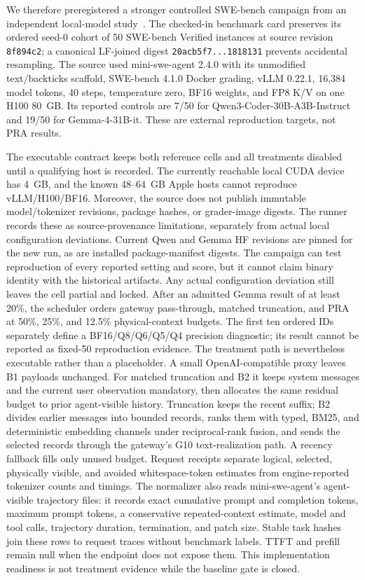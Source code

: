 \documentclass[11pt]{article}
\begin{document}
We therefore preregistered a stronger controlled SWE-bench campaign from an
independent local-model study~\cite{av2026localcoding}. The checked-in benchmark
card preserves its ordered seed-0 cohort of 50 SWE-bench Verified instances at
source revision \texttt{8f894c2}; a canonical LF-joined digest
\texttt{20acb5f7...1818131} prevents accidental resampling. The source used
mini-swe-agent 2.4.0 with its unmodified text/backticks scaffold, SWE-bench
4.1.0 Docker grading, vLLM 0.22.1, 16,384 model tokens, 40 steps, temperature
zero, BF16 weights, and FP8 K/V on one H100 80~GB. Its reported controls are
7/50 for Qwen3-Coder-30B-A3B-Instruct and 19/50 for Gemma-4-31B-it. These are
external reproduction targets, not PRA results.

The executable contract keeps both reference cells and all treatments disabled
until a qualifying host is recorded. The currently reachable local CUDA device
has 4~GB, and the known 48--64~GB Apple hosts cannot reproduce
vLLM/H100/BF16. Moreover, the source does not publish immutable
model/tokenizer revisions, package hashes, or grader-image digests. The runner
records these as source-provenance limitations, separately from actual local
configuration deviations. Current Qwen and Gemma HF revisions are pinned for
the new run, as are installed package-manifest digests. The campaign can test
reproduction of every reported setting and score, but it cannot claim binary
identity with the historical artifacts. Any actual configuration deviation
still leaves the cell partial and locked. After an admitted Gemma result of at
least 20\%, the scheduler orders gateway pass-through, matched
truncation, and PRA at 50\%, 25\%, and 12.5\% physical-context budgets. The
first ten ordered IDs separately define a BF16/Q8/Q6/Q5/Q4 precision
diagnostic; its result cannot be reported as fixed-50 reproduction evidence.
The treatment path is nevertheless executable rather than a placeholder. A
small OpenAI-compatible proxy leaves B1 payloads unchanged. For matched
truncation and B2 it keeps system messages and the current user observation
mandatory, then allocates the same residual budget to prior agent-visible
history. Truncation keeps the recent suffix; B2 divides earlier messages into
bounded records, ranks them with typed, BM25, and deterministic embedding
channels under reciprocal-rank fusion, and sends the selected records through
the gateway's G10 text-realization path. A recency fallback fills only unused
budget. Request receipts separate logical, selected, physically visible, and
avoided whitespace-token estimates from engine-reported tokenizer counts and
timings. The normalizer also reads mini-swe-agent's agent-visible trajectory
files: it records exact cumulative prompt and completion tokens, maximum prompt
tokens, a conservative repeated-context estimate, model and tool calls,
trajectory duration, termination, and patch size. Stable task hashes join these
rows to request traces without benchmark labels. TTFT and prefill remain null
when the endpoint does not expose them. This implementation readiness is not
treatment evidence while the baseline gate is closed.
\end{document}
